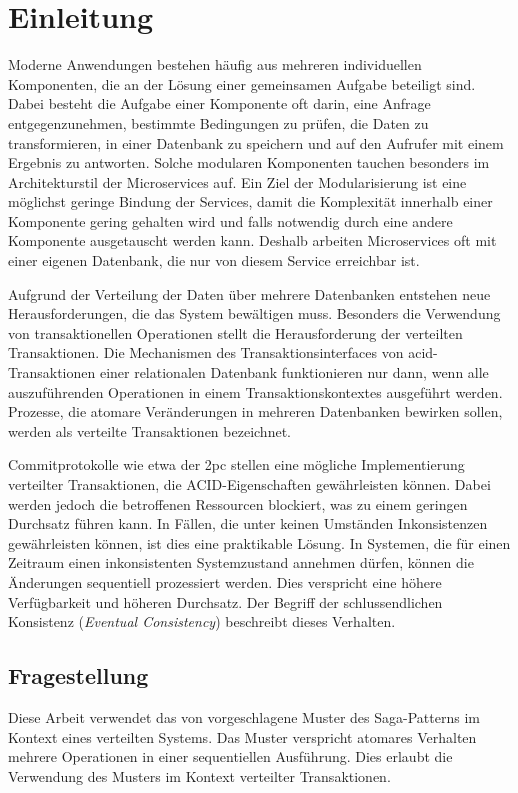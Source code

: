 \chapter{Einleitung}

Moderne Anwendungen bestehen häufig aus mehreren individuellen Komponenten, die an der Lösung einer gemeinsamen Aufgabe beteiligt sind. Dabei besteht die Aufgabe einer Komponente oft darin, eine Anfrage entgegenzunehmen, bestimmte Bedingungen zu prüfen, die Daten zu transformieren, in einer Datenbank zu speichern und auf den Aufrufer mit einem Ergebnis zu antworten. Solche modularen Komponenten tauchen besonders im Architekturstil der Microservices auf. Ein Ziel der Modularisierung ist eine möglichst geringe Bindung der Services, damit die Komplexität innerhalb einer Komponente gering gehalten wird und falls notwendig durch eine andere Komponente ausgetauscht werden kann. Deshalb arbeiten Microservices oft mit einer eigenen Datenbank, die nur von diesem Service erreichbar ist. 

Aufgrund der Verteilung der Daten über mehrere Datenbanken entstehen neue Herausforderungen, die das System bewältigen muss. Besonders die Verwendung von transaktionellen Operationen stellt die Herausforderung der verteilten Transaktionen. Die Mechanismen des Transaktionsinterfaces von \acrshort{acid}-Transaktionen einer relationalen Datenbank funktionieren nur dann, wenn alle auszuführenden Operationen in einem Transaktionskontextes ausgeführt werden. Prozesse, die atomare Veränderungen in mehreren Datenbanken bewirken sollen, werden als verteilte Transaktionen bezeichnet. 

Commitprotokolle wie etwa der \acrfull{2pc} stellen eine mögliche Implementierung verteilter Transaktionen, die ACID-Eigenschaften gewährleisten können. Dabei werden jedoch die betroffenen Ressourcen blockiert, was zu einem geringen Durchsatz führen kann. In Fällen, die unter keinen Umständen Inkonsistenzen gewährleisten können, ist dies eine praktikable Lösung. In Systemen, die für einen Zeitraum einen inkonsistenten Systemzustand annehmen dürfen, können die Änderungen sequentiell prozessiert werden. Dies verspricht eine höhere Verfügbarkeit und höheren Durchsatz. Der Begriff der schlussendlichen Konsistenz (\textit{Eventual Consistency}) beschreibt dieses Verhalten. 

\section{Fragestellung}
Diese Arbeit verwendet das von \citeauthor{GarciaMolina.1987} vorgeschlagene Muster des Saga-Patterns im Kontext eines verteilten Systems. Das Muster verspricht atomares Verhalten mehrere Operationen in einer sequentiellen Ausführung. Dies erlaubt die Verwendung des Musters im Kontext verteilter Transaktionen. 

